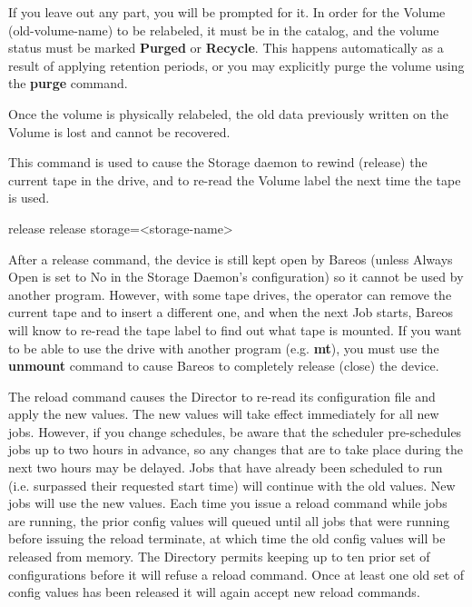 \begin{description}
\begin{bconsole}{relabel}
relabel storage=<storage-name> oldvolume=<old-volume-name> volume=<newvolume-name>}
\end{bconsole}

   If you leave out any part, you will be prompted for it.  In order for
   the Volume (old-volume-name) to be relabeled, it must be in the catalog,
   and the volume status must be marked {\bf Purged} or {\bf Recycle}.
   This happens automatically as a result of applying retention periods, or
   you may explicitly purge the volume using the {\bf purge} command.

   Once the volume is physically relabeled, the old data previously written
   on the Volume is lost and cannot be recovered.

\item [release]
   This command is used to cause the Storage daemon to rewind (release) the
   current tape in the drive, and to re-read the Volume label the next time
   the tape is used.

\begin{bconsole}{release}
release storage=<storage-name>
\end{bconsole}

   After a release command, the device is still kept open by Bareos (unless
   Always Open is set to No in the Storage Daemon's configuration) so it
   cannot be used by another program.  However, with some tape drives, the
   operator can remove the current tape and to insert a different one, and
   when the next Job starts, Bareos will know to re-read the tape label to
   find out what tape is mounted.  If you want to be able to use the drive
   with another program (e.g.  {\bf mt}), you must use the {\bf unmount}
   command to cause Bareos to completely release (close) the device.

\item [reload]
   The reload command causes the Director to re-read its configuration
   file and apply the new values. The new values will take effect
   immediately for all new jobs.  However, if you change schedules,
   be aware that the scheduler pre-schedules jobs up to two hours in
   advance, so any changes that are to take place during the next two
   hours may be delayed.  Jobs that have already been scheduled to run
   (i.e. surpassed their requested start time) will continue with the
   old values.  New jobs will use the new values. Each time you issue
   a reload command while jobs are running, the prior config values
   will queued until all jobs that were running before issuing
   the reload terminate, at which time the old config values will
   be released from memory. The Directory permits keeping up to
   ten prior set of configurations before it will refuse a reload
   command. Once at least one old set of config values has been
   released it will again accept new reload commands.


\end{description}
